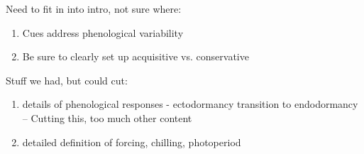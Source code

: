 \documentclass{article}
\begin{document}
Need to fit in into intro, not sure where:
\begin{enumerate}
\item Cues address phenological variability
\item Be sure to clearly set up acquisitive vs. conservative
\end{enumerate}

Stuff we had, but could cut:
\begin{enumerate}
\item details of phenological responses - ectodormancy transition to endodormancy -- Cutting this, too much other content
\item detailed definition of forcing, chilling, photoperiod
\end{enumerate}
\end{document}

